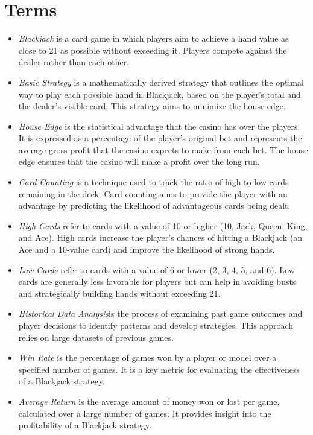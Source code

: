 \documentclass[a4paper,12pt]{report}
\begin{document}
\section{Terms}
\begin{itemize}  
\item \textit{Blackjack} is a card game in which players aim to achieve a hand value as close to 21 as possible without exceeding it. Players compete against the dealer rather than each other.
\item \textit{Basic Strategy} is a mathematically derived strategy that outlines the optimal way to play each possible hand in Blackjack, based on the player's total and the dealer's visible card. This strategy aims to minimize the house edge.

\item\textit{House Edge} is the statistical advantage that the casino has over the players. It is expressed as a percentage of the player's original bet and represents the average gross profit that the casino expects to make from each bet. The house edge ensures that the casino will make a profit over the long run.

\item\textit{Card Counting} is a technique used to track the ratio of high to low cards remaining in the deck. Card counting aims to provide the player with an advantage by predicting the likelihood of advantageous cards being dealt.

\item \textit{High Cards} refer to cards with a value of 10 or higher (10, Jack, Queen, King, and Ace). High cards increase the player's chances of hitting a Blackjack (an Ace and a 10-value card) and improve the likelihood of strong hands.

\item \textit{Low Cards} refer to cards with a value of 6 or lower (2, 3, 4, 5, and 6). Low cards are generally less favorable for players but can help in avoiding busts and strategically building hands without exceeding 21.

\item \textit{Historical Data Analysis}is the process of examining past game outcomes and player decisions to identify patterns and develop strategies. This approach relies on large datasets of previous games.

\item\textit{Win Rate} is the percentage of games won by a player or model over a specified number of games. It is a key metric for evaluating the effectiveness of a Blackjack strategy.

\item\textit{Average Return} is the average amount of money won or lost per game, calculated over a large number of games. It provides insight into the profitability of a Blackjack strategy. 
\end{itemize}
\end{document}
